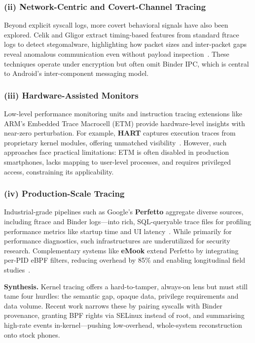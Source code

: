 \documentclass[a4paper,12pt]{report}
\begin{document}
\subsubsection*{(ii) Network-Centric and Covert-Channel Tracing}
Beyond explicit syscall logs, more covert behavioral signals have also been explored. Celik and Gligor extract timing-based features from standard ftrace logs to detect stegomalware, highlighting how packet sizes and inter-packet gaps reveal anomalous communication even without payload inspection~\cite{celik2021stego}. These techniques operate under encryption but often omit Binder IPC, which is central to Android’s inter-component messaging model.

\subsubsection*{(iii) Hardware-Assisted Monitors}
Low-level performance monitoring units and instruction tracing extensions like ARM’s Embedded Trace Macrocell (ETM) provide hardware-level insights with near-zero perturbation. For example, \textbf{HART} captures execution traces from proprietary kernel modules, offering unmatched visibility~\cite{zhang2020hart}. However, such approaches face practical limitations: ETM is often disabled in production smartphones, lacks mapping to user-level processes, and requires privileged access, constraining its applicability.

\subsubsection*{(iv) Production-Scale Tracing}
Industrial-grade pipelines such as Google’s \textbf{Perfetto} aggregate diverse sources, including ftrace and Binder logs—into rich, SQL-queryable trace files for profiling performance metrics like startup time and UI latency~\cite{maganti2022perfetto}. While primarily for performance diagnostics, such infrastructures are underutilized for security research. Complementary systems like \textbf{eMook} extend Perfetto by integrating per-PID eBPF filters, reducing overhead by 85\% and enabling longitudinal field studies~\cite{williams2024emook}.

\medskip
\noindent\textbf{Synthesis.}
Kernel tracing offers a hard-to-tamper, always-on lens but must still tame four hurdles: the semantic gap, opaque data, privilege requirements and data volume. Recent work narrows these by pairing syscalls with Binder provenance, granting BPF rights via SELinux instead of root, and summarising high-rate events in-kernel—pushing low-overhead, whole-system reconstruction onto stock phones.
\end{document}
